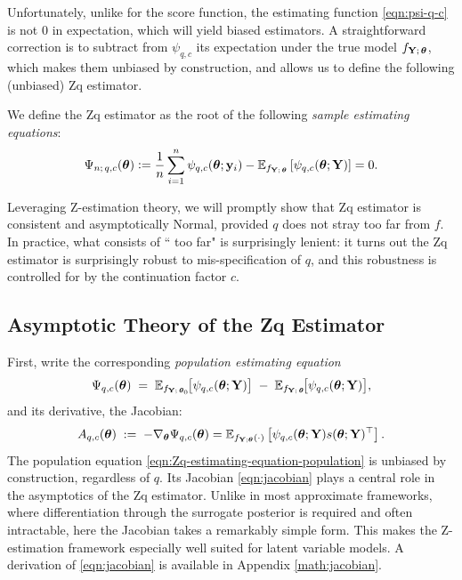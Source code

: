 \documentclass[twoside,11pt]{article}
\begin{document}
Unfortunately, unlike for the score function, the estimating function \eqref{eqn:psi-q-c} is not $0$ in expectation, which will yield biased estimators. A straightforward correction is to subtract from $\psi_{q,c}$ its expectation under the true model $f_{{\bf Y};\,{\bm{\theta}}}$, which makes them unbiased by construction, and allows us to define the following (unbiased) Zq estimator.

\begin{definition}[Zq Estimator]
We define the Zq estimator as the root of the following \textit{sample estimating equations}:
\begin{equation}
\Psi_{n;\,q,c}({\bm{\theta}}) \vcentcolon = \frac{1}{n}\sum_{i=1}^n \psi_{q,c}({\bm{\theta}};{\bf y}_i) - \mathbb{E}_{f_{{\bf Y};\,{\bm{\theta}}}}\left[\psi_{q,c}({\bm{\theta}};{\bf Y})\right] = 0.
\label{eqn:Zq-estimating-equations-sample}
\end{equation}
%
\end{definition}
Leveraging Z-estimation theory, we will promptly show that Zq estimator is consistent and asymptotically Normal, provided $q$ does not stray too far from $f$. In practice, what consists of `` too far" is surprisingly lenient: it turns out the Zq estimator is surprisingly robust to mis-specification of $q$, and this robustness is controlled for by the continuation factor $c$. 



\subsection{Asymptotic Theory of the Zq Estimator}

First, write  the corresponding \textit{population estimating equation}
\begin{equation}
\Psi_{q,c}({\bm{\theta}})\;=\;\mathbb{E}_{f_{{\bf Y};\,{{\bm{\theta}}_0}}}\!\big[\psi_{q,c}({\bm{\theta}};{\bf Y})\big]\;-\;\mathbb{E}_{f_{{\bf Y};\,{\bm{\theta}}}}\!\big[\psi_{q,c}({\bm{\theta}};{\bf Y})\big],
\label{eqn:Zq-estimating-equation-population}
\end{equation}
and its derivative, the Jacobian:
\begin{equation}
    A_{q,c}({\bm{\theta}})\;:=\;-\nabla_{\bm{\theta}} \Psi_{q,c}({\bm{\theta}}) = \mathbb{E}_{f_{{\bf Y};{\bm{\theta}}}(\cdot)}\left[\psi_{q,c}({\bm{\theta}};{\bf Y})s({\bm{\theta}};{\bf Y})^\top\right].
\label{eqn:jacobian}
\end{equation}
%
The population equation \eqref{eqn:Zq-estimating-equation-population} is unbiased 
by construction, regardless of $q$. Its Jacobian \eqref{eqn:jacobian} plays a 
central role in the asymptotics of the Zq estimator. Unlike in most approximate 
frameworks, where differentiation through the surrogate posterior is required and 
often intractable, here the Jacobian takes a remarkably simple form. This makes the 
Z-estimation framework especially well suited for latent variable models. A derivation of \eqref{eqn:jacobian} is available in Appendix \eqref{math:jacobian}.
\end{document}
